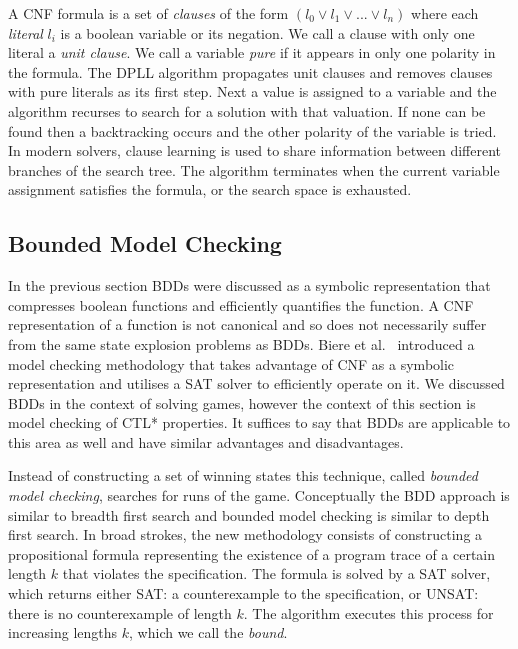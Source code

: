 A CNF formula is a set of \emph{clauses} of the form $(l_0 \lor l_1 \lor ...
\lor l_n)$ where each \emph{literal} $l_i$ is a boolean variable or its
negation. We call a clause with only one literal a \emph{unit clause}. We call
a variable \emph{pure} if it appears in only one polarity in the formula. The
DPLL algorithm propagates unit clauses and removes clauses with pure literals
as its first step. Next a value is assigned to a variable and the algorithm recurses to search for a solution with that valuation. If none can be found then a backtracking occurs and the other polarity of the variable is tried. In modern solvers, clause learning is used to share information between different branches of the search tree. The algorithm terminates when the current variable assignment satisfies the formula, or the search space is exhausted.

\subsection{Bounded Model Checking}

In the previous section BDDs were discussed as a symbolic representation that compresses boolean functions and efficiently quantifies the function. A CNF representation of a function is not canonical and so does not necessarily suffer from the same state explosion problems as BDDs. Biere et al.~\cite{Biere99} introduced a model checking methodology that takes advantage of CNF as a symbolic representation and utilises a SAT solver to efficiently operate on it. We discussed BDDs in the context of solving games, however the context of this section is model checking of CTL* properties. It suffices to say that BDDs are applicable to this area as well and have similar advantages and disadvantages.

Instead of constructing a set of winning states this technique, called \emph{bounded model checking}, searches for runs of the game. Conceptually the BDD approach is similar to breadth first search and bounded model checking is similar to depth first search. In broad strokes, the new methodology consists of constructing a propositional formula representing the existence of a program trace of a certain length $k$ that violates the specification. The formula is solved by a SAT solver, which returns either SAT: a counterexample to the specification, or UNSAT: there is no counterexample of length $k$. The algorithm executes this process for increasing lengths $k$, which we call the \emph{bound}.

